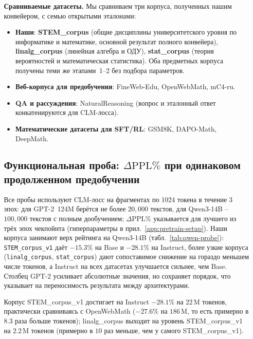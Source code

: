\documentclass{article}
\begin{document}
\textbf{Сравниваемые датасеты.}
Мы сравниваем три корпуса, полученных нашим конвейером, с семью открытыми эталонами:
\begin{itemize}
  \item \textbf{Наши}: \textbf{STEM\_corpus} (общие дисциплины университетского уровня по информатике и математике, основной результат полного конвейера), \textbf{linalg\_corpus} (линейная алгебра и ОДУ), \textbf{stat\_corpus} (теория вероятностей и математическая статистика). Оба предметных корпуса получены теми же этапами~1--2 без подбора параметров.
  \item \textbf{Веб-корпуса для предобучения}: FineWeb-Edu, OpenWebMath, mC4-ru.
  \item \textbf{QA и рассуждения}: NaturalReasoning (вопрос и эталонный ответ конкатенируются для CLM-лосса).
  \item \textbf{Математические датасеты для SFT/RL}: GSM8K, DAPO-Math, DeepMath.
\end{itemize}

\subsection{Функциональная проба: $\Delta\mathrm{PPL}\%$ при одинаковом продолженном предобучении}\label{sec:corpus-eval-deltappl}

Все пробы используют CLM-лосс на фрагментах по 1024 токена в течение 3 эпох: для GPT-2~124M берётся не более $20{,}000$ текстов, для Qwen3-14B -- $100{,}000$ текстов с полным дообучением; $\Delta\mathrm{PPL}\%$ указывается для лучшего из трёх эпох чекпойнта (гиперпараметры в прил.~\ref{app:pretrain-setup}). Наши корпуса занимают верх рейтинга на Qwen3-14B (табл.~\ref{tab:qwen-probe}): \texttt{STEM\_corpus\_v1} даёт $-15.3\%$ на Base и $-28.1\%$ на Instruct, более узкие корпуса (\texttt{linalg\_corpus}, \texttt{stat\_corpus}) дают сопоставимое снижение на гораздо меньшем числе токенов, а Instruct на всех датасетах улучшается сильнее, чем Base. Столбец GPT-2 усиливает абсолютные значения, но сохраняет порядок, что указывает на переносимость результата между архитектурами.

Корпус STEM\_corpus\_v1 достигает на Instruct $-28.1\%$ на $22$\,M токенов, практически сравниваясь с OpenWebMath ($-27.6\%$ на $186$\,M, то есть примерно в $8.3$ раза больше токенов); linalg\_corpus выходит на уровень STEM\_corpus\_v1 на $2.2$\,M токенов (примерно в $10$ раз меньше, чем у самого STEM\_corpus\_v1).
\end{document}
